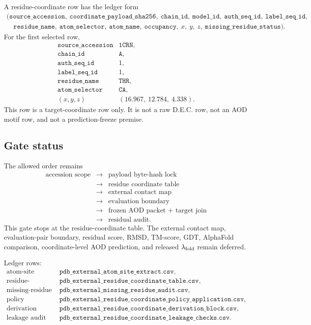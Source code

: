 A residue-coordinate row has the ledger form
\[
\begin{array}{l}
(\texttt{source\_accession},\ \texttt{coordinate\_payload\_sha256},\ \texttt{chain\_id},\
\texttt{model\_id},\ \texttt{auth\_seq\_id},\ \texttt{label\_seq\_id},\\
\quad \texttt{residue\_name},\ \texttt{atom\_selector},\ \texttt{atom\_name},\
\texttt{occupancy},\ x,\ y,\ z,\ \texttt{missing\_residue\_status}).
\end{array}
\]
For the first selected row,
\[
\begin{array}{ll}
\texttt{source\_accession} & \texttt{1CRN},\\
\texttt{chain\_id} & \texttt{A},\\
\texttt{auth\_seq\_id} & 1,\\
\texttt{label\_seq\_id} & 1,\\
\texttt{residue\_name} & \texttt{THR},\\
\texttt{atom\_selector} & \texttt{CA},\\
(x,y,z) & (16.967,\ 12.784,\ 4.338).
\end{array}
\]
This row is a target-coordinate row only. It is not a raw D.E.C. row, not an AOD motif row, and not a prediction-freeze premise.

\subsection{Gate status}

The allowed order remains
\[
\begin{array}{rcl}
\text{accession scope} &\to& \text{payload byte-hash lock}\\
&\to& \text{residue coordinate table}\\
&\to& \text{external contact map}\\
&\to& \text{evaluation boundary}\\
&\to& \text{frozen AOD packet + target join}\\
&\to& \text{residual audit}.
\end{array}
\]
This gate stops at the residue-coordinate table. The external contact map, evaluation-pair boundary, residual score, RMSD, TM-score, GDT, AlphaFold comparison, coordinate-level AOD prediction, and released \(\lambda_{\rm fold}\) remain deferred.

Ledger rows:
\[
\begin{array}{ll}
\text{atom-site extract} & \texttt{pdb\_external\_atom\_site\_extract.csv},\\
\text{residue-coordinate table} & \texttt{pdb\_external\_residue\_coordinate\_table.csv},\\
\text{missing-residue audit} & \texttt{pdb\_external\_missing\_residue\_audit.csv},\\
\text{policy application} & \texttt{pdb\_external\_residue\_coordinate\_policy\_application.csv},\\
\text{derivation block} & \texttt{pdb\_external\_residue\_coordinate\_derivation\_block.csv},\\
\text{leakage audit} & \texttt{pdb\_external\_residue\_coordinate\_leakage\_checks.csv}.
\end{array}
\]

